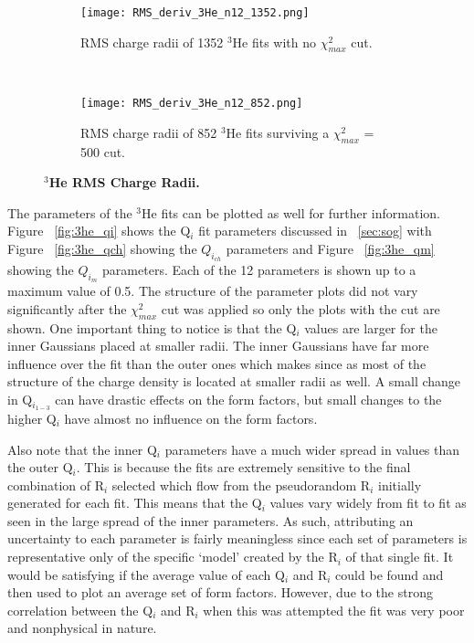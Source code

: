 \begin{figure}[!ht]
\begin{subfigure}{1.\textwidth}
  \centering
  \texttt{[image: RMS\_deriv\_3He\_n12\_1352.png]}
  \caption{RMS charge radii of 1352 $^3$He fits with no $\chi^2_{max}$ cut.}
  \label{fig:3he_rms_deriv_no_cut}
\end{subfigure}\\
\begin{subfigure}{1.\textwidth}
  \centering
  \texttt{[image: RMS\_deriv\_3He\_n12\_852.png]}
  \caption{RMS charge radii of 852 $^3$He fits surviving a $\chi^2_{max}$ = 500 cut.}
  \label{fig:3he_rms_deriv_cut}
\end{subfigure}
\caption{\bf{$^3$He RMS Charge Radii.}}
\label{fig:3he_rms_deriv}
\end{figure}

The parameters of the $^3$He fits can be plotted as well for further information. Figure ~\ref{fig:3he_qi} shows the Q$_i$ fit parameters discussed in ~\ref{sec:sog} with Figure ~\ref{fig:3he_qch} showing the $Q_{i_{ch}}$ parameters and Figure ~\ref{fig:3he_qm} showing the $Q_{i_{m}}$ parameters. Each of the 12 parameters is shown up to a maximum value of 0.5. The structure of the parameter plots did not vary significantly after the $\chi^2_{max}$ cut was applied so only the plots with the cut are shown. One important thing to notice is that the Q$_i$ values are larger for the inner Gaussians placed at smaller radii. The inner Gaussians have far more influence over the fit than the outer ones which makes since as most of the structure of the charge density is located at smaller radii as well. A small change in Q$_{i_{1-3}}$ can have drastic effects on the form factors, but small changes to the higher Q$_i$ have almost no influence on the form factors. 

Also note that the inner Q$_i$ parameters have a much wider spread in values than the outer Q$_i$. This is because the fits are extremely sensitive to the final combination of R$_i$ selected which flow from the pseudorandom R$_i$ initially generated for each fit. This means that the Q$_i$ values vary widely from fit to fit as seen in the large spread of the inner parameters. As such, attributing an uncertainty to each parameter is fairly meaningless since each set of parameters is representative only of the specific `model' created by the R$_i$ of that single fit. It would be satisfying if the average value of each Q$_i$ and R$_i$ could be found and then used to plot an average set of form factors. However, due to the strong correlation between the Q$_i$ and R$_i$ when this was attempted the fit was very poor and nonphysical in nature.

